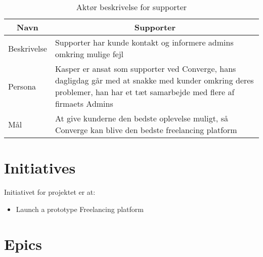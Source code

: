 \begin{table}[H]
    \begin{small}
        \caption{Aktør beskrivelse for supporter}
        \label{tab:supporter}
        \begin{center}
            \begin{tabular}[c]{p{3cm}|p{8cm}}
                \multicolumn{1}{c|}{\textbf{Navn}} & \multicolumn{1}{c}{\textbf{Supporter}}                                                                                                                                                            \\
                \hline
                Beskrivelse                        & \multicolumn{1}{p{10cm}}{Supporter har kunde kontakt og informere admins omkring mulige fejl}                                                                                                     \\
                \hline
                Persona                            & \multicolumn{1}{p{10cm}}{Kasper er ansat som supporter ved Converge, hans dagligdag går med at snakke med kunder omkring deres problemer, han har et tæt samarbejde med flere af firmaets Admins} \\
                \hline
                Mål                                & \multicolumn{1}{p{10cm}}{At give kunderne den bedste oplevelse muligt, så Converge kan blive den bedste freelancing platform}                                                                     \\
            \end{tabular}
        \end{center}
    \end{small}
\end{table}

\section{Initiatives}

Initiativet for projektet er at:

\begin{itemize}
    \item Launch a prototype Freelancing platform
\end{itemize}

\section{Epics}

